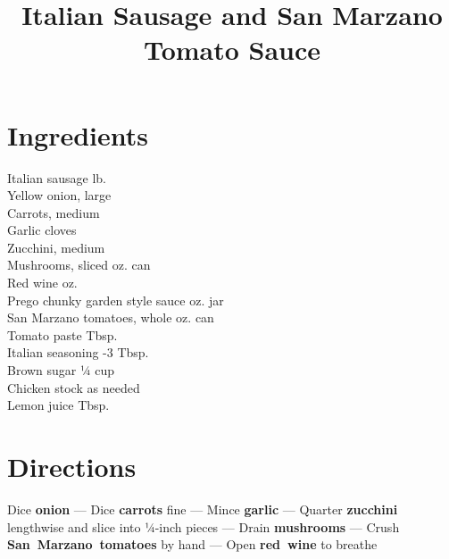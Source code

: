 \documentclass[11pt,letterpaper]{article}
\title{Italian Sausage and San Marzano Tomato Sauce}
\author{}
\date{}
\begin{document}
\maketitle
\thispagestyle{empty}

\section*{Ingredients}
\setlength{\columnsep}{20pt}
\begin{multicols}{2}
\noindent
    Italian sausage  lb. \\
    Yellow onion, large  \\
    Carrots, medium  \\
    Garlic cloves  \\
    Zucchini, medium  \\
    Mushrooms, sliced  oz. can \\
    Red wine  oz. \\
    \columnbreak
    Prego chunky garden style sauce  oz. jar \\
    San Marzano tomatoes, whole  oz. can \\
    Tomato paste  Tbsp. \\
    Italian seasoning -3 Tbsp. \\
    Brown sugar \dotfill ¼ cup \\
    Chicken stock \dotfill as needed \\
    Lemon juice  Tbsp. \\
\end{multicols}

\section*{Directions}

\noindent
Dice \textbf{onion} ---
Dice \textbf{carrots} fine ---
Mince \textbf{garlic} ---
Quarter \textbf{zucchini} lengthwise and slice into ¼-inch pieces ---
Drain \textbf{mushrooms} ---
Crush \textbf{San~Marzano~tomatoes} by hand ---
Open \textbf{red~wine} to breathe
\end{document}

